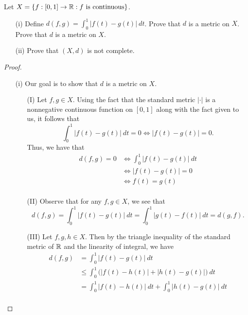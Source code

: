 \documentclass[a4paper]{article}
\begin{document}
\begin{problem}
    Let \( X = \{ f: [0,1] \to \mathbb{R} : f \ \text{is continuous} \}  \).
       \begin{enumerate}
           \item[(i)] Define \( d(f,g) = \displaystyle \int_{ 0 }^{ 1 }  | f(t) - g(t) |  \ dt \). Prove that \( d \) is  a metric on \( X  \). Prove that \( d \) is a metric on \( X  \).
            \item[(ii)] Prove that \( (X,d) \) is not complete.
       \end{enumerate} 
\end{problem}
\begin{proof}
\begin{enumerate}
    \item[(i)] Our goal is to show that \( d  \) is a metric on \( X  \). 
        \begin{enumerate}
            \item[(I)] Let \( f,g \in X  \). Using the fact that the standard metric \( | \cdot |   \) is a nonnegative continuous function on \( [0,1] \) along with the fact given to us, it follows that
                \[  \int_{ 0 }^{ 1 } | f(t) - g(t) |  \ dt = 0 \iff | f(t) - g(t) |  = 0.  \]
                Thus, we have that
                \begin{align*}
                    d(f,g) = 0 &\iff \int_{ 0 }^{ 1 }  | f(t) - g(t) |  \ dt \\
                               &\iff | f(t) - g(t) | = 0 \\
                               &\iff f(t)  = g(t) \tag{\( | \cdot |  \) is a metric on \( \R  \)} \\ 
                \end{align*}
            \item[(II)] Observe that for any \( f,g \in X  \), we see that
                \[  d(f,g) = \int_{ 0 }^{ 1 }  | f(t) - g(t) |  \ dt  = \int_{ 0 }^{ 1 }  | g(t) - f(t) |  \ dt = d(g,f). \]
            \item[(III)] Let \( f,g,h \in X  \). Then by the triangle inequality of the standard metric of \( \mathbb{R}  \) and the linearity of integral, we have
                \begin{align*}
                    d(f,g) &= \int_{ 0 }^{ 1 } | f(t) - g(t) |  \ dt  \\
                           &\leq \int_{ 0 }^{ 1 }  \Big( | f(t) - h(t) |  + | h(t) - g(t) | \Big)  \ dt \\
                           &= \int_{ 0 }^{ 1 }  | f(t) - h(t) |  \ dt + \int_{ 0 }^{ 1 }  | h(t) - g(t) |  \ dt \\

\end{align*}
\end{enumerate}
\end{enumerate}
\end{proof}
\end{document}
